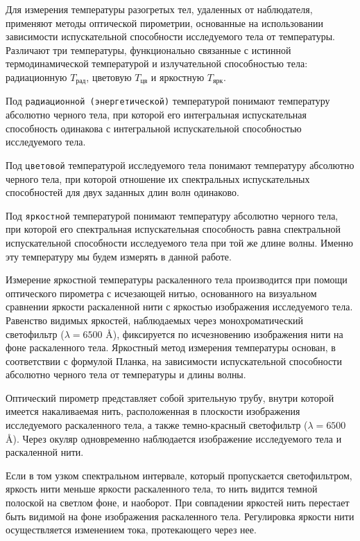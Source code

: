 \documentclass[a4paper,12pt]{article}
\begin{document}
Для измерения температуры разогретых тел, удаленных от наблюдателя, применяют методы оптической пирометрии, основанные на использовании зависимости испускательной способности исследуемого тела от температуры. Различают три температуры, функционально связанные с истинной термодинамической температурой и излучательной способностью тела: радиационную $T_{\text{рад}}$, цветовую $T_{\text{цв}}$ и яркостную $T_{\text{ярк}}$.

Под \texttt{радиационной (энергетической)} температурой понимают температуру абсолютно черного тела, при которой его интегральная испускательная способность одинакова с интегральной испускательной способностью исследуемого тела.

Под \texttt{цветовой} температурой исследуемого тела понимают температуру абсолютно черного тела, при которой отношение их спектральных испускательных способностей для двух заданных длин волн одинаково.

Под \texttt{яркостной} температурой понимают температуру абсолютно черного тела, при которой его спектральная испускательная способность равна спектральной испускательной способности исследуемого тела при той же длине волны. Именно эту температуру мы будем измерять в данной работе.

Измерение яркостной температуры раскаленного тела производится при помощи оптического пирометра с исчезающей нитью, основанного на визуальном сравнении яркости раскаленной нити с яркостью изображения исследуемого тела. Равенство видимых яркостей, наблюдаемых через монохроматический светофильтр ($\lambda = 6500$ Å), фиксируется по исчезновению изображения нити на фоне раскаленного тела. Яркостный метод измерения температуры основан, в соответствии с формулой Планка, на зависимости испускательной способности абсолютно черного тела от температуры и длины волны.

Оптический пирометр представляет собой зрительную трубу, внутри которой имеется накаливаемая нить, расположенная в плоскости изображения исследуемого раскаленного тела, а также темно-красный светофильтр ($\lambda = 6500$ Å). Через окуляр одновременно наблюдается изображение исследуемого тела и раскаленной нити.

Если в том узком спектральном интервале, который пропускается светофильтром, яркость нити меньше яркости раскаленного тела, то нить видится темной полоской на светлом фоне, и наоборот. При совпадении яркостей нить перестает быть видимой на фоне изображения раскаленного тела. Регулировка яркости нити осуществляется изменением тока, протекающего через нее.
\end{document}
